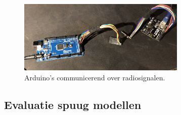 \begin{description}
\begin{figure}[H]
    \centering
    \includegraphics[width = 80mm]{04_idee_ontwikkeling/RC_arduinos.jpg}
    \caption{Arduino's communicerend over radiosignalen.}
    \label{fig:arduino}
\end{figure} 


\end{description}


\subsection{Evaluatie spuug modellen}
\vspace{\baselineskip}

